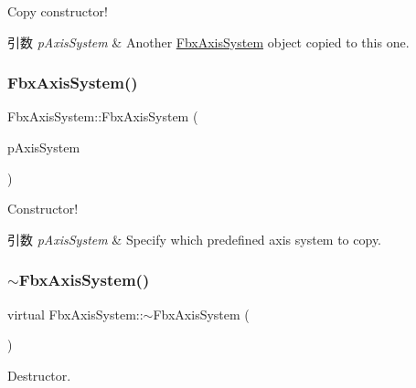 Copy constructor! 
\begin{DoxyParams}{引数}
{\em p\+Axis\+System} & Another \hyperlink{class_fbx_axis_system}{Fbx\+Axis\+System} object copied to this one. \\
\hline
\end{DoxyParams}
\mbox{\label{class_fbx_axis_system_a8333ad188498e489a2bf065c2b5b1ad3}} 
\subsubsection{\texorpdfstring{Fbx\+Axis\+System()}{FbxAxisSystem()}\hspace{0.1cm}{\footnotesize\ttfamily [4/4]}}
{\footnotesize\ttfamily Fbx\+Axis\+System\+::\+Fbx\+Axis\+System (\begin{DoxyParamCaption}\item[{const \hyperlink{class_fbx_axis_system_a0391b88959ec9ed790cb76eac9a6ed17}{E\+Pre\+Defined\+Axis\+System}}]{p\+Axis\+System }\end{DoxyParamCaption})}

Constructor! 
\begin{DoxyParams}{引数}
{\em p\+Axis\+System} & Specify which predefined axis system to copy. \\
\hline
\end{DoxyParams}
\mbox{\label{class_fbx_axis_system_ae1c61cb9cf7208d0c4373d8c894bec8c}} 
\subsubsection{\texorpdfstring{$\sim$\+Fbx\+Axis\+System()}{~FbxAxisSystem()}}
{\footnotesize\ttfamily virtual Fbx\+Axis\+System\+::$\sim$\+Fbx\+Axis\+System (\begin{DoxyParamCaption}{ }\end{DoxyParamCaption})\hspace{0.3cm}{\ttfamily [virtual]}}



Destructor. 



